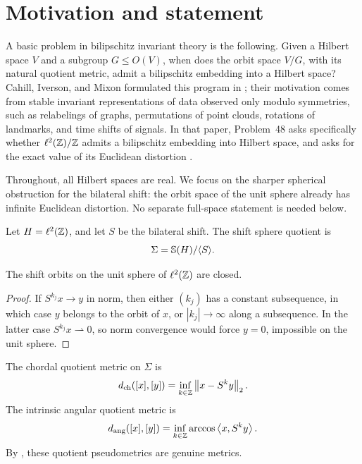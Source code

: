 \section{Motivation and statement}

A basic problem in bilipschitz invariant theory is the following.  Given a
Hilbert space $V$ and a subgroup $G\le O(V)$, when does the orbit space $V/G$,
with its natural quotient metric, admit a bilipschitz embedding into a Hilbert
space?  Cahill, Iverson, and Mixon formulated this program in
\cite{CahillIversonMixon}; their motivation comes from stable invariant
representations of data observed only modulo symmetries, such as relabelings of
graphs, permutations of point clouds, rotations of landmarks, and time shifts of
signals.  In that paper, Problem~48 asks specifically whether
$\ell^2(\mathbb Z)/\mathbb Z$ admits a bilipschitz embedding into Hilbert space, and asks for
the exact value of its Euclidean distortion \cite[Problem~48]{CahillIversonMixon}.

Throughout, all Hilbert spaces are real.  We focus on the sharper spherical
obstruction for the bilateral shift: the orbit space of the unit sphere already
has infinite Euclidean distortion.  No separate full-space statement is needed
below.

\begin{definition}\label{def:shift-sphere-quotient}
\leanok
Let $H=\ell^2(\mathbb Z)$, and let $S$ be the bilateral shift.  The shift sphere
quotient is
\[
        \Sigma=\mathbb S(H)/\langle S\rangle .
\]
\end{definition}

\begin{lemma}\label{lem:shift-orbits-closed}
\leanok
{}
The shift orbits on the unit sphere of $\ell^2(\mathbb Z)$ are closed.
\end{lemma}

\begin{proof}
If $S^{k_j}x\to y$ in norm, then either $(k_j)$ has a constant subsequence, in
which case $y$ belongs to the orbit of $x$, or $|k_j|\to\infty$ along a
subsequence.  In the latter case $S^{k_j}x\rightharpoonup0$, so norm convergence
would force $y=0$, impossible on the unit sphere.
\end{proof}

\begin{definition}
\label{def:shift-quotient-metrics}
\leanok
{}
The chordal quotient metric on $\Sigma$ is
\[
        d_{\rm ch}([x],[y])=\inf_{k\in\mathbb Z}\left\lVert x-S^k y\right\rVert_2.
\]
The intrinsic angular quotient metric is
\[
        d_{\rm ang}([x],[y])=\inf_{k\in\mathbb Z}\arccos\left\langle x,S^k y\right\rangle.
\]
By , these quotient pseudometrics are genuine
metrics.
\end{definition}


